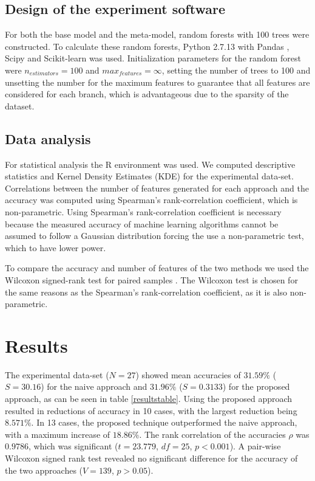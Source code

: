 \documentclass[conference]{IEEEtran}
\begin{document}
\subsection{Design of the experiment software}
For both the base model and the meta-model, random forests with 100 trees were constructed.
To calculate these random forests, Python 2.7.13 with Pandas \cite{mckinney-proc-scipy-2010}, Scipy \cite{scipy} and Scikit-learn \cite{scikit-learn} was used.
Initialization parameters for the random forest were $n_{estimators}=100$ and $max_{features}=\infty$, setting the number of trees to 100 and unsetting the number for the maximum features to guarantee that all features are considered for each branch, which is advantageous due to the sparsity of the dataset.

\subsection{Data analysis}
For statistical analysis the R environment was used\cite{rlang2016}. We computed descriptive statistics and Kernel Density Estimates (KDE) for the experimental data-set. Correlations between the number of features generated for each approach and the accuracy was computed using Spearman's rank-correlation coefficient, which is non-parametric. Using Spearman's rank-correlation coefficient is necessary because the measured accuracy of machine learning algorithms cannot be assumed to follow a Gaussian distribution forcing the use a non-parametric test, which to have lower power.

To compare the accuracy and number of features of the two methods we used the Wilcoxon signed-rank test for paired samples \cite{wilcoxon1945}. The Wilcoxon test is chosen for the same reasons as the Spearman's rank-correlation coefficient, as it is also non-parametric.

\section{Results}
The experimental data-set ($N=27$) showed mean accuracies of $31.59\%$ ($S=30.16$) for the naive approach and $31.96\%$ ($S=0.3133$) for the proposed approach, as can be seen in table \ref{resultstable}. Using the proposed approach resulted in reductions of accuracy in 10 cases, with the largest reduction being $8.571\%$. In 13 cases, the proposed technique outperformed the naive approach, with a maximum increase of $18.86\%$. The rank correlation of the accuracies $\rho$ was $0.9786$, which was significant ($t=23.779$, $df=25$, $p < 0.001$). A pair-wise Wilcoxon signed rank test revealed no significant difference for the accuracy of the two approaches ($V=139$, $p > 0.05$).
\end{document}
